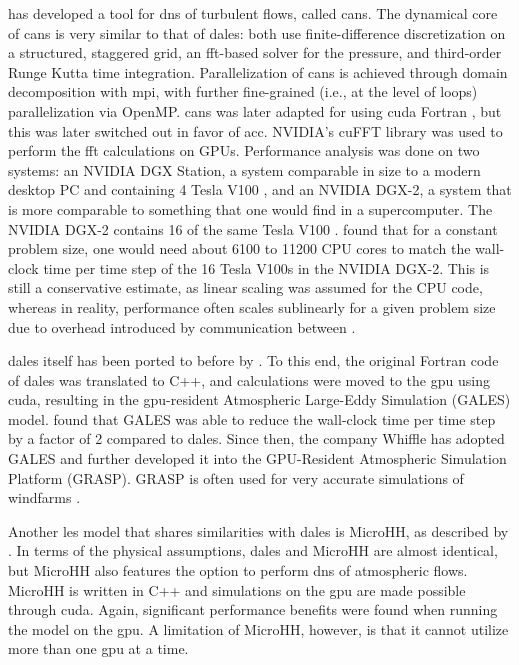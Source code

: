 \citet{costaFFTbasedFinitedifferenceSolver2018} has developed a tool for \acrshort{dns} of turbulent flows, called \acrshort{cans}. The dynamical core of \acrshort{cans} is very similar to that of \acrshort{dales}: both use finite-difference discretization on a structured, staggered grid, an \acrshort{fft}-based solver for the pressure, and third-order Runge Kutta time integration. Parallelization of \acrshort{cans} is achieved through domain decomposition with \acrshort{mpi}, with further fine-grained (i.e., at the level of loops) parallelization via OpenMP. \acrshort{cans} was later adapted for  using \acrshort{cuda} Fortran \citep{costaGPUAccelerationCaNS2021}, but this was later switched out in favor of \acrshort{acc}. NVIDIA's cuFFT library was used to perform the \acrshort{fft} calculations on GPUs. Performance analysis was done on two systems: an NVIDIA DGX Station, a system comparable in size to a modern desktop PC and containing 4 Tesla V100 , and an NVIDIA DGX-2, a system that is more comparable to something that one would find in a supercomputer. The NVIDIA DGX-2 contains 16 of the same Tesla V100 . \citet{costaGPUAccelerationCaNS2021} found that for a constant problem size, one would need about 6100 to 11200 CPU cores to match the wall-clock time per time step of the 16 Tesla V100s in the NVIDIA DGX-2. This is still a conservative estimate, as linear scaling was assumed for the CPU code, whereas in reality, performance often scales sublinearly for a given problem size due to overhead introduced by communication between .

\acrshort{dales} itself has been ported to  before by \citet{schalkwijkHighPerformanceSimulationsTurbulent2012}. To this end, the original Fortran code of \acrshort{dales} was translated to C++, and calculations were moved to the \acrshort{gpu} using \acrshort{cuda}, resulting in the \acrshort{gpu}-resident Atmospheric Large-Eddy Simulation (GALES) model. \citet{schalkwijkHighPerformanceSimulationsTurbulent2012} found that GALES was able to reduce the wall-clock time per time step by a factor of 2 compared to \acrshort{dales}. Since then, the company Whiffle has adopted GALES and further developed it into the GPU-Resident Atmospheric Simulation Platform (GRASP). GRASP is often used for very accurate simulations of windfarms \citep{verzijlberghAtmosphericFlowsLarge2021}.

Another \acrshort{les} model that shares similarities with \acrshort{dales} is MicroHH, as described by \citet{vanheerwaardenMicroHHComputationalFluid2017}. In terms of the physical assumptions, \acrshort{dales} and MicroHH are almost identical, but MicroHH also features the option to perform \acrshort{dns} of atmospheric flows. MicroHH is written in C++ and simulations on the \acrshort{gpu} are made possible through \acrshort{cuda}. Again, significant performance benefits were found when running the model on the \acrshort{gpu}. A limitation of MicroHH, however, is that it cannot utilize more than one \acrshort{gpu} at a time.

